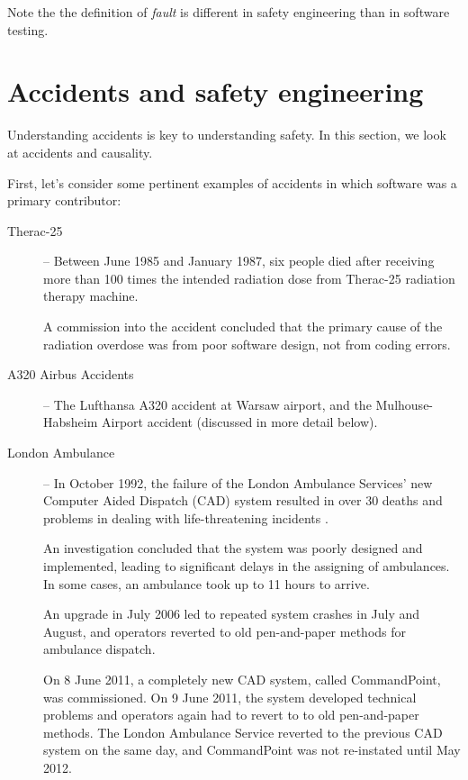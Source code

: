 Note the the definition of \emph{fault} is different in safety engineering than in software testing.

\section{Accidents and safety engineering}

Understanding accidents is key to understanding safety. In this section, we look at accidents and causality.


First, let's consider some pertinent examples of accidents in which software was a primary contributor:

  \begin{description}

    \item[Therac-25]  -- Between June 1985 and January 1987, six people died after receiving more than 100 times the intended radiation dose from Therac-25 radiation therapy machine.

   A commission into the accident concluded that the primary cause of the radiation overdose was from poor software design, not from coding errors.

    \item[A320 Airbus Accidents] -- The Lufthansa A320 accident at
      Warsaw airport, and the Mulhouse-Habsheim Airport accident (discussed in more detail below).

    \item[London Ambulance] -- In October 1992, the failure of the London Ambulance Services' new
      Computer Aided Dispatch (CAD) system resulted in over 30 deaths and
      problems in dealing with life-threatening incidents \cite{finkelstein1996comedy}.

   An investigation concluded that the system was poorly designed and implemented, leading to significant delays in the assigning of ambulances. In some cases, an ambulance took up to 11 hours to arrive.

   An upgrade in July 2006 led to repeated system crashes in July and August, and operators reverted to old pen-and-paper methods for ambulance dispatch. 

   On 8 June 2011, a completely new CAD system, called CommandPoint, was commissioned. On 9 June 2011, the system developed technical problems and operators again had to revert to to old pen-and-paper methods. The London Ambulance Service reverted to the previous CAD system on the same day, and CommandPoint was not re-instated until May 2012.

  \end{description}


